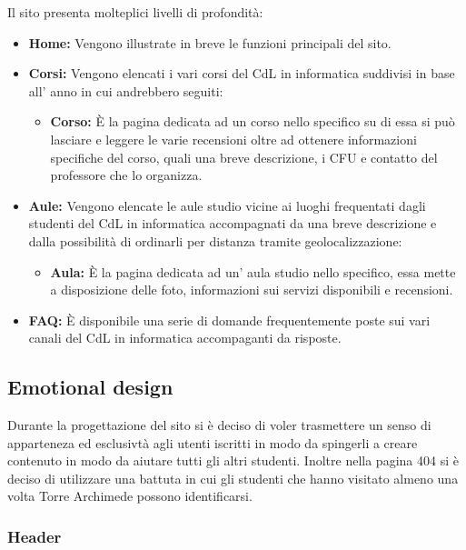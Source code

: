 Il sito presenta molteplici livelli di profondità:
\begin{itemize}
    \item \textbf{Home: } Vengono illustrate in breve le funzioni principali del sito.
    \item \textbf{Corsi: } Vengono elencati i vari corsi del CdL in informatica suddivisi in base all' anno in cui andrebbero seguiti:
        \begin{itemize}
            \item \textbf{Corso: } \`E la pagina dedicata ad un corso nello specifico su di essa si può lasciare e leggere le varie recensioni oltre ad ottenere informazioni specifiche del corso, quali una breve descrizione, i CFU e contatto del professore che lo organizza.
        \end{itemize}
    \item \textbf{Aule: } Vengono elencate le aule studio vicine ai luoghi frequentati dagli studenti del CdL in informatica accompagnati da una breve descrizione e dalla possibilità di ordinarli per distanza tramite geolocalizzazione:
        \begin{itemize}
            \item \textbf{Aula: } È la pagina dedicata ad un' aula studio nello specifico, essa mette a disposizione delle foto, informazioni sui servizi disponibili e recensioni.
        \end{itemize}
    \item \textbf{FAQ: } \`E disponibile una serie di domande frequentemente poste sui vari canali del CdL in informatica accompaganti da risposte.
\end{itemize}

\subsection{Emotional design}
Durante la progettazione del sito si è deciso di voler trasmettere un senso di apparteneza ed esclusivtà agli utenti iscritti in modo da spingerli a creare contenuto in modo da aiutare tutti gli altri studenti.
Inoltre nella pagina 404 si è deciso di utilizzare una battuta in cui gli studenti che hanno visitato almeno una volta Torre Archimede possono identificarsi.


\subsubsection{Header}
